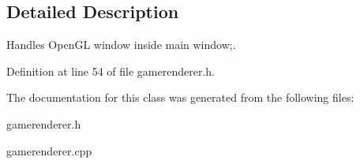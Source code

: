 \subsection{Detailed Description}
Handles Open\-G\-L window inside main window;. 

Definition at line 54 of file gamerenderer.\-h.



The documentation for this class was generated from the following files\-:\begin{DoxyCompactItemize}
\item 
gamerenderer.\-h\item 
gamerenderer.\-cpp\end{DoxyCompactItemize}
